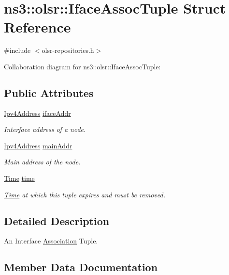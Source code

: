 \hypertarget{structns3_1_1olsr_1_1IfaceAssocTuple}{}\section{ns3\+:\+:olsr\+:\+:Iface\+Assoc\+Tuple Struct Reference}
\label{structns3_1_1olsr_1_1IfaceAssocTuple}


{\ttfamily \#include $<$olsr-\/repositories.\+h$>$}



Collaboration diagram for ns3\+:\+:olsr\+:\+:Iface\+Assoc\+Tuple\+:
\subsection*{Public Attributes}
\begin{DoxyCompactItemize}
\item 
\hyperlink{classns3_1_1Ipv4Address}{Ipv4\+Address} \hyperlink{structns3_1_1olsr_1_1IfaceAssocTuple_a01bb563fdb87354699523982722ba4e1}{iface\+Addr}
\begin{DoxyCompactList}\small\item\em Interface address of a node. \end{DoxyCompactList}\item 
\hyperlink{classns3_1_1Ipv4Address}{Ipv4\+Address} \hyperlink{structns3_1_1olsr_1_1IfaceAssocTuple_ab8718ae7260c4fcdf68fbdb3e86831c2}{main\+Addr}
\begin{DoxyCompactList}\small\item\em Main address of the node. \end{DoxyCompactList}\item 
\hyperlink{classns3_1_1Time}{Time} \hyperlink{structns3_1_1olsr_1_1IfaceAssocTuple_aa24bf7f7814e70fb42cbe708b59e4915}{time}
\begin{DoxyCompactList}\small\item\em \hyperlink{classns3_1_1Time}{Time} at which this tuple expires and must be removed. \end{DoxyCompactList}\end{DoxyCompactItemize}


\subsection{Detailed Description}
An Interface \hyperlink{structns3_1_1olsr_1_1Association}{Association} Tuple. 

\subsection{Member Data Documentation}
